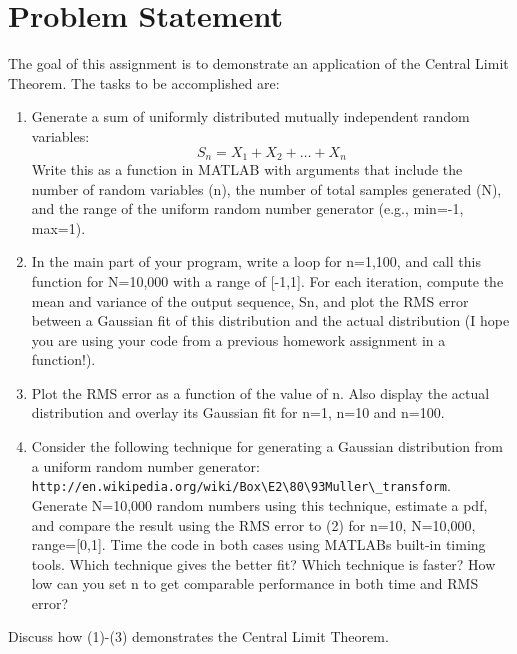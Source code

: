  
\usepackage{listings}
\usepackage[normalem]{ulem}
\lstset{
  numbers=left,
  language=Python,
  showstringspaces=false
}


\maketitle %

\section{Problem Statement} 
The goal of this assignment is to demonstrate an application of the Central Limit Theorem.
The tasks to be accomplished are:
\begin{enumerate} 
\item Generate a sum of uniformly distributed mutually independent random variables:
\begin{equation}
S_n = X_1 + X_2 + \dots + X_n
\end{equation}
Write this as a function in MATLAB with arguments that include the number of random variables (n), the number of total samples generated (N), and the range of the uniform random number generator (e.g., min=-1, max=1).

\item In the main part of your program, write a loop for n=1,100, and call this function for N=10,000 with a range of [-1,1]. For each iteration, compute the mean and variance of the output sequence, Sn, and plot the RMS error between a Gaussian fit of this distribution and the actual distribution (I hope you are using your code from a previous homework assignment in a function!).

\item Plot the RMS error as a function of the value of n. Also display the actual distribution and overlay its Gaussian fit for n=1, n=10 and n=100.

\item  Consider the following technique for generating a Gaussian distribution from a uniform random number generator: \\ \verb|http://en.wikipedia.org/wiki/Box\E2\80\93Muller\_transform|.\\
Generate N=10,000 random numbers using this technique, estimate a pdf, and compare the result using the RMS error to (2) for n=10, N=10,000, range=[0,1]. Time the code in both cases using MATLABs built-in timing tools. Which technique gives the better fit? Which technique is faster? How low can you set n to get comparable performance in both time and RMS error?
\end{enumerate}
Discuss how (1)-(3) demonstrates the Central Limit Theorem.


